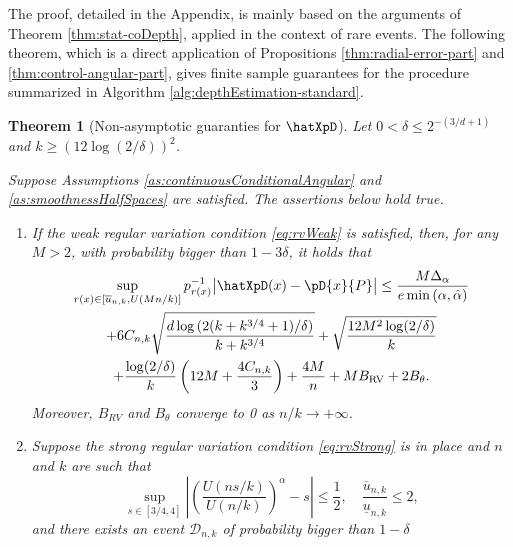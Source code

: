 \documentclass{article}
\numberwithin{equation}{section}
\newtheorem{theorem}{Theorem}[section]
\newcommand{\coD}[2]{\pD{#1}{#2}}
\begin{document}
The proof, detailed in the Appendix, is mainly based on the arguments of Theorem \ref{thm:stat-coDepth}, applied in the context of rare events. The following theorem, which is a direct application of Propositions
\ref{thm:radial-error-part}
and \ref{thm:control-angular-part}, gives finite sample guarantees
for the procedure summarized in Algorithm \ref{alg:depthEstimation-standard}.

\begin{theorem}[Non-asymptotic guaranties for \(\hatXpD\)]\label{theo:xcod}
Let \(0<\delta\leq 2^{-(3/d+1)}\) and \(k\geq (12\log(2/\delta))^2\).

Suppose Assumptions \ref{as:continuousConditionalAngular} and
\ref{as:smoothnessHalfSpaces} are satisfied. The assertions below hold true.

\begin{enumerate}[label=(\roman*)]
    \item If the weak regular variation condition
        \eqref{eq:rvWeak} is satisfied, then, for any \(M>2\), with
        probability bigger
        than \(1-3\delta\), it
        holds that 
        \begin{multline}
        \sup_{r(x)\in \left[\overline{u}_{n,k},
            U(Mn/k)\right]} p_{r(x)}^{-1}\big|
        \hatXpD(x) -\coD{x}{P}\big|\leq 
            \frac{M\Delta_{\alpha}}{e
            \min{(\alpha,\hat{\alpha})}} \\  +
            6C_{n,k}\sqrt{\frac{d\log{(2(k+k^{3/4}+1)/\delta)}}{k+k^{3/4}}}
            + \sqrt{\frac{12M^2\log(2/\delta)}{k}} \\
            +\frac{\log(2/\delta)}{k}\left(12M+\frac{4C_{n,k}}{3}\right)
            +\frac{4M}{n} +
            MB_\textnormal{RV} + 2B_{\theta}
            \label{eq:xcod_finite_sample_bound_fixed_M}.
        \end{multline}
        Moreover, \(B_{RV}\) and
        \(B_\theta\) converge to 0 as \(n/k\to +\infty\).
    \item Suppose the strong regular variation condition
        \eqref{eq:rvStrong} is in place
        and \(n\) and \(k\) are such that
        \begin{equation*}
            \sup_{s\in[3/4,4]}{\left|\left(\frac{U(ns/k)}{U(n/k)}\right)^{\alpha}-s\right|}\leq
            \frac{1}{2},\quad\frac{\overline{u}_{n,k}}{\underline{u}_{n,k}}\leq
            2,
        \end{equation*}
        and there exists an event \(\mathcal{D}_{n,k}\) of
        probability bigger than \(1-\delta\)

\end{enumerate}
\end{theorem}
\end{document}
